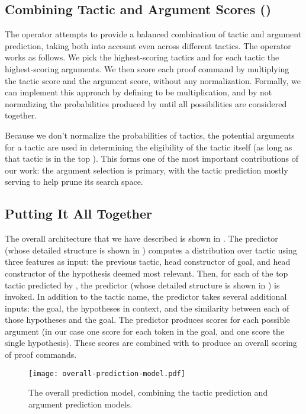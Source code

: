 \documentclass[sigplan,screen]{acmart}
\renewcommand{\>}{\quad}
\begin{document}
\subsection{Combining Tactic and Argument Scores ()}

The  operator attempts to provide a balanced combination
  of tactic and argument prediction,
  taking both into account even across different tactics.
The operator works as follows. We pick the  highest-scoring
tactics and for each tactic the  highest-scoring arguments. We then score
each proof command by multiplying the tactic score and the argument score,
without any normalization. Formally, we can implement this approach by defining
 to be multiplication, and by not normalizing the probabilities
produced by  until all possibilities are considered together.

Because we don't normalize the probabilities of tactics, the potential
arguments for a tactic are used in determining the eligibility of the
tactic itself (as long as that tactic is in the top ). This forms
one of the most important contributions of our work: the argument
selection is primary, with the tactic prediction mostly serving to
help prune its search space.

\subsection{Putting It All Together}

The overall architecture that we have described is shown in .
The  predictor (whose detailed structure is shown in ) computes a distribution over tactic using three features as input: the previous tactic, head
constructor of goal, and head constructor of the hypothesis deemed most relevant.
Then, for each of the top tactic predicted by , the  predictor (whose detailed structure is shown in ) is invoked.
In addition to the tactic name, the  predictor takes several additional inputs: the goal, the hypotheses in context, and the similarity between each of those hypotheses and the goal.
The  predictor produces scores for each possible argument (in our case one score for each token in the goal, and one score the single hypothesis).
These scores are combined with  to produce an overall scoring of proof commands.

\begin{figure*}
\texttt{[image: overall-prediction-model.pdf]}
\caption{The overall prediction model, combining the tactic prediction and argument prediction models.}
\label{fig:overall-model}
\end{figure*}
\end{document}

